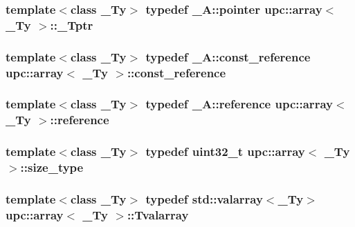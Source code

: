 \subsubsection[{\texorpdfstring{\+\_\+\+Tptr}{_Tptr}}]{\setlength{\rightskip}{0pt plus 5cm}template$<$class \+\_\+\+Ty$>$ typedef \+\_\+\+A\+::pointer {\bf upc\+::array}$<$ \+\_\+\+Ty $>$\+::{\bf \+\_\+\+Tptr}}\hypertarget{classupc_1_1array_a4ef66945898a2c393cff5be41de077d2}{}\label{classupc_1_1array_a4ef66945898a2c393cff5be41de077d2}
\subsubsection[{\texorpdfstring{const\+\_\+reference}{const_reference}}]{\setlength{\rightskip}{0pt plus 5cm}template$<$class \+\_\+\+Ty$>$ typedef \+\_\+\+A\+::const\+\_\+reference {\bf upc\+::array}$<$ \+\_\+\+Ty $>$\+::{\bf const\+\_\+reference}}\hypertarget{classupc_1_1array_a3b639eaadbf9a2c410d7c02d3d1c01e4}{}\label{classupc_1_1array_a3b639eaadbf9a2c410d7c02d3d1c01e4}
\subsubsection[{\texorpdfstring{reference}{reference}}]{\setlength{\rightskip}{0pt plus 5cm}template$<$class \+\_\+\+Ty$>$ typedef \+\_\+\+A\+::reference {\bf upc\+::array}$<$ \+\_\+\+Ty $>$\+::{\bf reference}}\hypertarget{classupc_1_1array_a99066373537d57ee780ce4d3396314f8}{}\label{classupc_1_1array_a99066373537d57ee780ce4d3396314f8}
\subsubsection[{\texorpdfstring{size\+\_\+type}{size_type}}]{\setlength{\rightskip}{0pt plus 5cm}template$<$class \+\_\+\+Ty$>$ typedef uint32\+\_\+t {\bf upc\+::array}$<$ \+\_\+\+Ty $>$\+::{\bf size\+\_\+type}}\hypertarget{classupc_1_1array_a85501f086a20ed6686ef78a242b2f302}{}\label{classupc_1_1array_a85501f086a20ed6686ef78a242b2f302}
\subsubsection[{\texorpdfstring{Tvalarray}{Tvalarray}}]{\setlength{\rightskip}{0pt plus 5cm}template$<$class \+\_\+\+Ty$>$ typedef std\+::valarray$<$\+\_\+\+Ty$>$ {\bf upc\+::array}$<$ \+\_\+\+Ty $>$\+::{\bf Tvalarray}\hspace{0.3cm}{\ttfamily [private]}}\hypertarget{classupc_1_1array_a2d2187ace46e59d689195d96a53e9965}{}\label{classupc_1_1array_a2d2187ace46e59d689195d96a53e9965}


